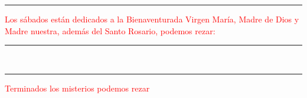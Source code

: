 \documentclass[10pt,twoside]{book}
\begin{document}
\begin{paracol}{2}
\begin{rightcolumn}
            
      \end{rightcolumn}

      \begin{leftcolumn*}
            

            
      \end{leftcolumn*}
      \begin{rightcolumn}
            

            
      \end{rightcolumn}
\end{paracol}

\iralfinal

\begin{center}
      {\rule{10em}{0.4pt}}

      \vspace{0.75em}

      \textcolor{red}{Los sábados están dedicados a la Bienaventurada Virgen María, Madre de Dios y Madre nuestra, 
      además del Santo Rosario, podemos rezar:}
\end{center}

\begin{multicols}{2}

      
      
\end{multicols}

\begin{center}
      \begin{spacing}{0.25}
            {\rule{20em}{0.4pt}}\\
            {\rule{20em}{0.4pt}}
      \end{spacing}
\end{center}

\label{final-prayer}
\begin{center}
      \textcolor{red}{Terminados los misterios podemos rezar}
\end{center}
\end{document}
